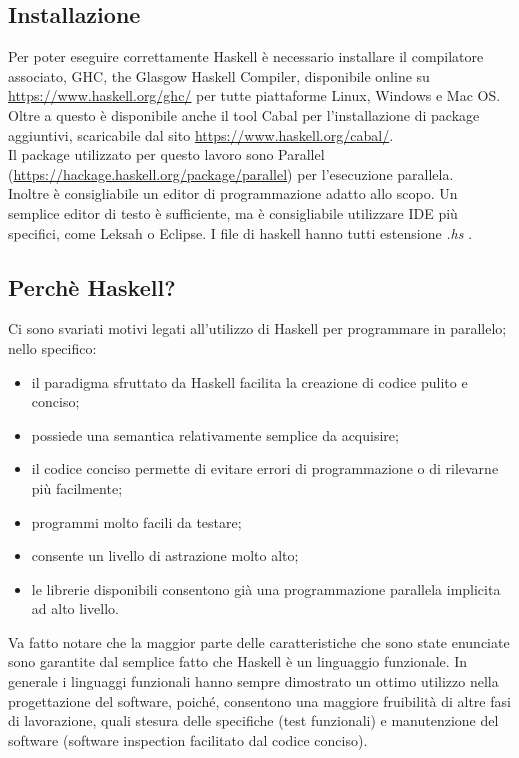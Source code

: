 \subsection{Installazione}
Per poter eseguire correttamente Haskell è necessario installare il compilatore associato, GHC, the Glasgow Haskell Compiler, disponibile online su \url{https://www.haskell.org/ghc/} per tutte piattaforme Linux, Windows e Mac OS.\\
Oltre a questo è disponibile anche il tool Cabal per l'installazione di package aggiuntivi, scaricabile dal sito \url{https://www.haskell.org/cabal/}.\\
Il package utilizzato per questo lavoro sono Parallel (\url{https://hackage.haskell.org/package/parallel}) per l'esecuzione parallela.\\
Inoltre è consigliabile un editor di programmazione adatto allo scopo. Un semplice editor di testo è sufficiente, ma è consigliabile utilizzare IDE più specifici, come Leksah o Eclipse. I file di haskell hanno tutti estensione \textit{.hs} .
\subsection{Perchè Haskell?}
Ci sono svariati motivi legati all'utilizzo di Haskell per programmare in parallelo; nello specifico:
\begin{itemize}
\item{il paradigma sfruttato da Haskell facilita la creazione di codice pulito e conciso;}
\item{possiede una semantica relativamente semplice da acquisire;}
\item{il codice conciso permette di evitare errori di programmazione o di rilevarne più facilmente;}
\item{programmi molto facili da testare;}
\item{consente un livello di astrazione molto alto;}
\item{le librerie disponibili consentono già una programmazione parallela implicita ad alto livello.}
\end{itemize}
Va fatto notare che la maggior parte delle caratteristiche che sono state enunciate sono garantite dal semplice fatto che Haskell è un linguaggio funzionale. In generale i linguaggi funzionali hanno sempre dimostrato un ottimo utilizzo nella progettazione del software, poiché, consentono una maggiore fruibilità di altre fasi di lavorazione, quali stesura delle specifiche (test funzionali) e manutenzione del software (software inspection facilitato dal codice conciso).\\
